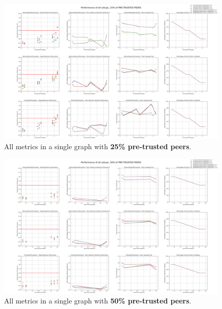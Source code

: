 \begin{figure}
    \centering
    \includegraphics[width=0.94\paperwidth, angle=90]{assets/25_all_metrics.png}
    \caption{All metrics in a single graph with \textbf{25\% pre-trusted peers}.}
    \label{fig:performance-all-setups-25-pretrusted}
\end{figure}

\begin{figure}
    \centering
    \includegraphics[width=0.94\paperwidth, angle=90]{assets/50_all_metrics.png}
    \caption{All metrics in a single graph with \textbf{50\% pre-trusted peers}.}
    \label{fig:performance-all-setups-50-pretrusted}
\end{figure}

\newpage
